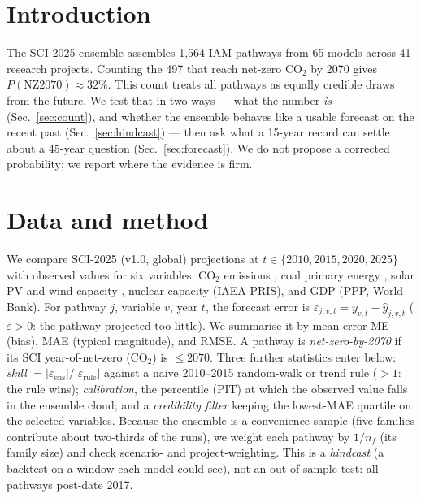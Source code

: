 \documentclass[sigconf, nonacm]{acmart}
\begin{document}
\section{Introduction}
The SCI 2025 ensemble assembles 1{,}564 IAM pathways from 65 models across 41 research projects. Counting the 497 that reach net-zero CO$_2$ by 2070 gives $P(\text{NZ2070})\approx 32\%$. This count treats all pathways as equally credible draws from the future. We test that in two ways --- what the number \emph{is} (Sec.~\ref{sec:count}), and whether the ensemble behaves like a usable forecast on the recent past (Sec.~\ref{sec:hindcast}) --- then ask what a 15-year record can settle about a 45-year question (Sec.~\ref{sec:forecast}). We do not propose a corrected probability; we report where the evidence is firm.

\section{Data and method}
\label{sec:method}
We compare SCI-2025 (v1.0, global) projections at $t\in\{2010,2015,2020,2025\}$ with observed values for six variables: CO$_2$ emissions \cite{gcb}, coal primary energy \cite{ei}, solar PV and wind capacity \cite{irena}, nuclear capacity (IAEA PRIS), and GDP (PPP, World Bank). For pathway $j$, variable $v$, year $t$, the forecast error is $\varepsilon_{j,v,t}=y_{v,t}-\hat{y}_{j,v,t}$ ($\varepsilon>0$: the pathway projected too little). We summarise it by mean error ME (bias), MAE (typical magnitude), and RMSE. A pathway is \emph{net-zero-by-2070} if its SCI year-of-net-zero (CO$_2$) is $\leq 2070$. Three further statistics enter below: \emph{skill} $=|\varepsilon_{\text{ens}}|/|\varepsilon_{\text{rule}}|$ against a naive 2010--2015 random-walk or trend rule ($>1$: the rule wins); \emph{calibration}, the percentile (PIT) at which the observed value falls in the ensemble cloud; and a \emph{credibility filter} keeping the lowest-MAE quartile on the selected variables. Because the ensemble is a convenience sample (five families contribute about two-thirds of the runs), we weight each pathway by $1/n_f$ (its family size) and check scenario- and project-weighting. This is a \emph{hindcast} (a backtest on a window each model could see), not an out-of-sample test: all pathways post-date 2017.
\end{document}
